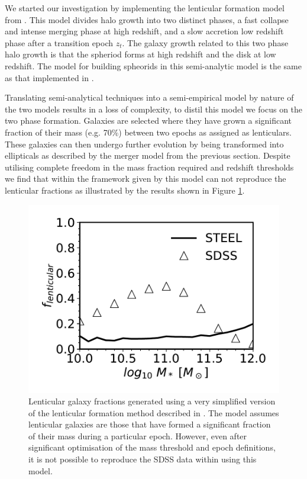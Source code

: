 We started our investigation by implementing the lenticular formation model from \citet{Cook2009Two-phaseFormation}. This model divides halo growth into two distinct phases, a fast collapse and intense merging phase at high redshift, and a slow accretion low redshift phase after a transition epoch $z_{t}$. The galaxy growth related to this two phase halo growth is that the spheriod forms at high redshift and the disk at low redshift. The model for building spheorids in this semi-analytic model is the same as that implemented in \citet{Granato2004AHosts}. 

Translating semi-analytical techniques into a semi-empirical model by nature of the two models results in a loss of complexity, to distil this model we focus on the two phase formation. Galaxies are selected where they have grown a significant fraction of their mass (e.g. 70\%) between two epochs as assigned as lenticulars. These galaxies can then undergo further evolution by being transformed into ellipticals as described by the merger model from the previous section. Despite utilising complete freedom in the mass fraction required and redshift thresholds we find that within the framework given by \steel this model can not reproduce the lenticular fractions as illustrated by the results shown in Figure \ref{fig:CookeModel}.

\begin{figure}
  \includegraphics[width=\linewidth]{Figures/Chapter5/CookModel.pdf}
    \caption{Lenticular galaxy fractions generated using a very simplified
      version of the lenticular formation method described in
      \cite{Cook2009Two-phaseFormation}. The model assumes lenticular galaxies are those that have formed a significant fraction of their mass during a particular epoch. However, even after significant optimisation of the mass
      threshold and epoch definitions, it is not possible to reproduce the SDSS
      data within \steel using this model.}
    \label{fig:CookeModel}
\end{figure}


